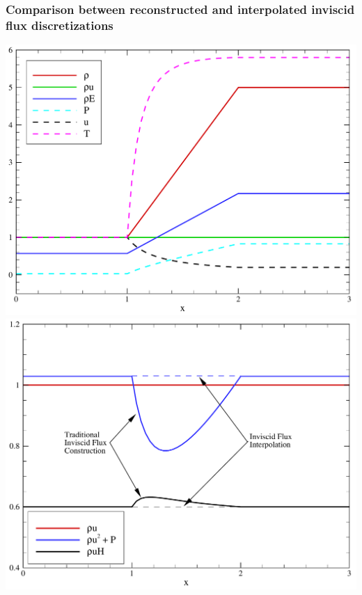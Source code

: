 \documentclass[compress,11pt]{beamer}
\begin{document}
\frame
{
  \frametitle{\scriptsize Comparison between reconstructed and interpolated inviscid flux discretizations}
  \includegraphics[width=.48\textwidth]{figures/comp_ns_interpolation/primitive_vars}
  \includegraphics[width=.48\textwidth]{figures/comp_ns_interpolation/inv_flux}
}
\end{document}
